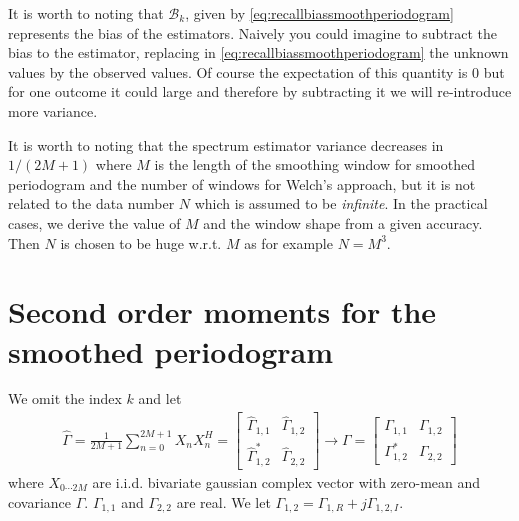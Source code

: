 It is worth to noting that $\mathcal{B}_{k}$, given by \eqref{eq:recallbiassmoothperiodogram} represents the bias of the estimators. Naively you could imagine to subtract the bias to the estimator, replacing in \eqref{eq:recallbiassmoothperiodogram} the unknown values by the observed values. Of course the expectation of this quantity is 0 but for one outcome it could large and therefore by subtracting it we will re-introduce more variance.

\bigskip
It is worth to noting that the spectrum estimator variance decreases in $1/(2M+1)$ where $M$ is the length of the smoothing window for smoothed periodogram and  the number of windows for Welch's approach, but it is not related to the data number $N$ which is assumed to be \emph{infinite}. In the practical cases, we derive the value of $M$ and the window shape from a given accuracy. Then $N$ is chosen to be huge w.r.t. $M$ as for example $N=M^{3}$.



\section{Second order moments for the smoothed periodogram}
We omit the index $k$ and let 
\begin{eqnarray}
 \label{eq:deferiosmooth}
 \hat\Gamma = \frac{1}{2M+1}\sum_{n=0}^{2M+1}X_{n}X_{n}^{H}
 =
 \begin{bmatrix}
 \hat\Gamma_{1,1}
 &
 \hat\Gamma_{1,2}
 \\
 \hat\Gamma_{1,2}^{*}
 &
 \hat\Gamma_{2,2}
 \end{bmatrix}
 \rightarrow 
 \Gamma =
  \begin{bmatrix}
 \Gamma_{1,1}
 &
 \Gamma_{1,2}
 \\
 \Gamma_{1,2}^{*}
 &
 \Gamma_{2,2}
 \end{bmatrix}
\end{eqnarray}
where $X_{0\cdots 2M}$ are i.i.d. bivariate gaussian complex vector with zero-mean and covariance $\Gamma$. $\Gamma_{1,1}$ and $\Gamma_{2,2}$ are real. We let $\Gamma_{1,2}=\Gamma_{1,R}+j\Gamma_{1,2,I}$. 

